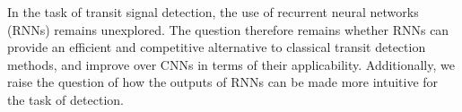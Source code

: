 In the task of transit signal detection, the use of recurrent neural networks (RNNs) remains unexplored. The question therefore remains whether RNNs can provide an efficient and competitive alternative to classical transit detection methods, and improve over CNNs in terms of their applicability. Additionally, we raise the question of how the outputs of RNNs can be made more intuitive for the task of detection. 

